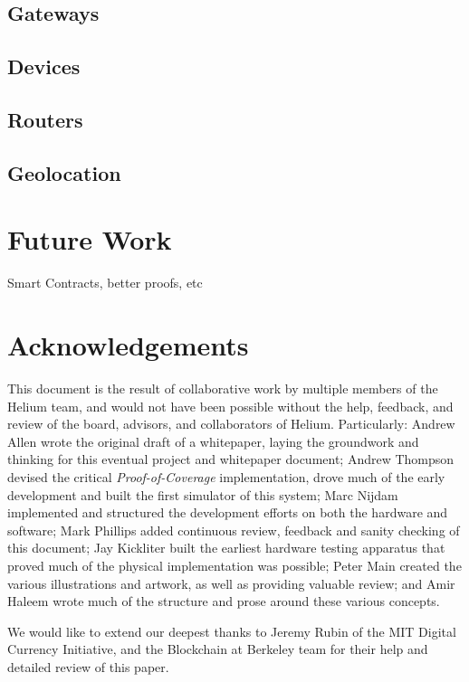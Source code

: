 \documentclass[letterpaper,11pt]{article}
\def\proofofcoverage/{\textit{Proof-of-Coverage}}
\begin{document}
\subsection{Gateways}

\subsection{Devices}

\subsection{Routers}

\subsection{Geolocation}

\section{Future Work}

Smart Contracts, better proofs, etc

\newpage

\section{Acknowledgements}

This document is the result of collaborative work by multiple members of the Helium team, and would not have been possible without the help, feedback, and review of the board, advisors, and collaborators of Helium. Particularly: Andrew Allen wrote the original draft of a whitepaper, laying the groundwork and thinking for this eventual project and whitepaper document; Andrew Thompson devised the critical \proofofcoverage/ implementation, drove much of the early development and built the first simulator of this system; Marc Nijdam implemented and structured the development efforts on both the hardware and software; Mark Phillips added continuous review, feedback and sanity checking of this document; Jay Kickliter built the earliest hardware testing apparatus that proved much of the physical implementation was possible; Peter Main created the various illustrations and artwork, as well as providing valuable review; and Amir Haleem wrote much of the structure and prose around these various concepts.\newline

We would like to extend our deepest thanks to Jeremy Rubin of the MIT Digital Currency Initiative, and the Blockchain at Berkeley team for their help and detailed review of this paper.\newline
\end{document}
